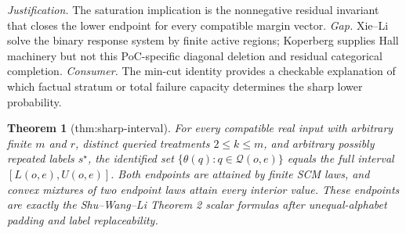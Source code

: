 \documentclass{article}
\newtheorem{theorem}{Theorem}
\begin{document}
\par\smallskip\noindent \textit{Justification.} The saturation implication is the nonnegative residual invariant that closes the lower endpoint for every compatible margin vector. \textit{Gap.} Xie--Li solve the binary response system by finite active regions; Koperberg supplies Hall machinery but not this PoC-specific diagonal deletion and residual categorical completion. \textit{Consumer.} The min-cut identity provides a checkable explanation of which factual stratum or total failure capacity determines the sharp lower probability.

\begin{theorem}[thm:sharp-interval]\label{thm:sharp-interval}
For every compatible real input with arbitrary finite \(m\) and \(r\), distinct queried treatments \(2\leq k\leq m\), and arbitrary possibly repeated labels \(s^\star\), the identified set \(\{\theta(q):q\in\mathcal Q(o,e)\}\) equals the full interval \([L(o,e),U(o,e)]\). Both endpoints are attained by finite SCM laws, and convex mixtures of two endpoint laws attain every interior value. These endpoints are exactly the Shu--Wang--Li Theorem 2 scalar formulas after unequal-alphabet padding and label replaceability.
\end{theorem}
\end{document}
